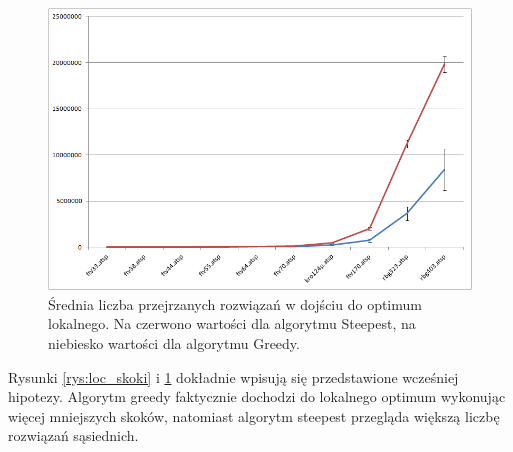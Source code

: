 \begin{figure}[!h]
\centering\includegraphics[width=12cm]{img/loc_sasiedzi}
\caption{Średnia liczba przejrzanych rozwiązań w dojściu do optimum lokalnego. Na czerwono wartości dla algorytmu Steepest, na niebiesko wartości dla algorytmu Greedy.}\label{rys:loc_sasiedzi}
\end{figure}

Rysunki \ref{rys:loc_skoki} i \ref{rys:loc_sasiedzi} dokładnie wpisują się przedstawione wcześniej hipotezy. Algorytm greedy faktycznie dochodzi do lokalnego optimum wykonując więcej mniejszych skoków, natomiast algorytm steepest przegląda większą liczbę rozwiązań sąsiednich.